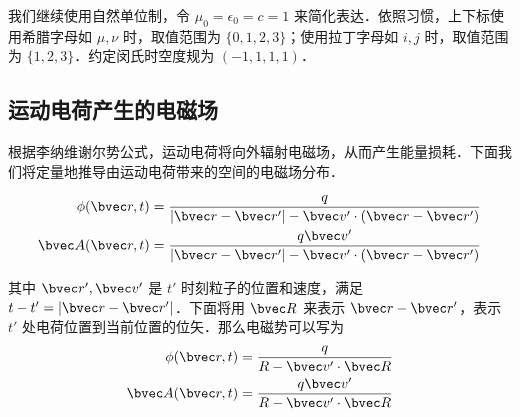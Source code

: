 

我们继续使用自然单位制，令 $\mu_0=\epsilon_0=c=1$ 来简化表达．依照习惯，上下标使用希腊字母如 $\mu, \nu$ 时，取值范围为 $\{0, 1, 2, 3\}$；使用拉丁字母如 $i, j$ 时，取值范围为 $\{1, 2, 3\}$．约定闵氏时空度规为 $(-1,1,1,1)$．
\subsection{运动电荷产生的电磁场}
根据李纳维谢尔势公式，运动电荷将向外辐射电磁场，从而产生能量损耗．下面我们将定量地推导由运动电荷带来的空间的电磁场分布．

\begin{equation}
\begin{aligned}
\phi(\bvec r,t)=\frac{q}{|\bvec r-\bvec r'|-\bvec v'\cdot (\bvec r-\bvec r')}\\
\bvec A(\bvec r,t)=\frac{q\bvec v'}{|\bvec r-\bvec r'|-\bvec v'\cdot (\bvec r-\bvec r')}
\end{aligned}
\end{equation}

其中 $\bvec r',\bvec v'$ 是 $t'$ 时刻粒子的位置和速度，满足 $t-t'=|\bvec r-\bvec r'|$．下面将用 $\bvec R$ 来表示 $\bvec r-\bvec r'$，表示 $t'$ 处电荷位置到当前位置的位矢．那么电磁势可以写为
\begin{equation}
\begin{aligned}
\phi(\bvec r,t)=\frac{q}{R-\bvec v'\cdot \bvec R}\\
\bvec A(\bvec r,t)=\frac{q\bvec v'}{R-\bvec v'\cdot \bvec R}
\end{aligned}
\end{equation}

